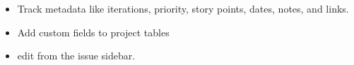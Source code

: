 \begin{frame}
  \frametitle{\insertsectionhead}
  \framesubtitle{\insertsubsectionhead}
  \begin{columns}
    \begin{itemize}
      \item Track metadata like iterations, priority, story points, dates, notes, and links. 
      \item Add custom fields to project tables 
      \item edit from the issue sidebar.
    \end{itemize}
  \end{columns}
  

\end{frame}

